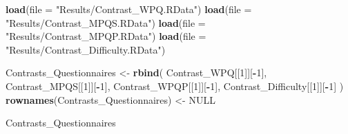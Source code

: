 \documentclass[
]{article}
\newenvironment{Shaded}{\begin{snugshade}}{\end{snugshade}}
\newcommand{\AttributeTok}[1]{\textcolor[rgb]{0.13,0.29,0.53}{#1}}
\newcommand{\ConstantTok}[1]{\textcolor[rgb]{0.56,0.35,0.01}{#1}}
\newcommand{\DecValTok}[1]{\textcolor[rgb]{0.00,0.00,0.81}{#1}}
\newcommand{\FunctionTok}[1]{\textcolor[rgb]{0.13,0.29,0.53}{\textbf{#1}}}
\newcommand{\NormalTok}[1]{#1}
\newcommand{\OtherTok}[1]{\textcolor[rgb]{0.56,0.35,0.01}{#1}}
\newcommand{\SpecialCharTok}[1]{\textcolor[rgb]{0.81,0.36,0.00}{\textbf{#1}}}
\newcommand{\StringTok}[1]{\textcolor[rgb]{0.31,0.60,0.02}{#1}}
\begin{document}
\begin{Shaded}
\begin{Highlighting}[]
\FunctionTok{load}\NormalTok{(}\AttributeTok{file =} \StringTok{"Results/Contrast\_WPQ.RData"}\NormalTok{)}
\FunctionTok{load}\NormalTok{(}\AttributeTok{file =} \StringTok{"Results/Contrast\_MPQS.RData"}\NormalTok{)}
\FunctionTok{load}\NormalTok{(}\AttributeTok{file =} \StringTok{"Results/Contrast\_MPQP.RData"}\NormalTok{)}
\FunctionTok{load}\NormalTok{(}\AttributeTok{file =} \StringTok{"Results/Contrast\_Difficulty.RData"}\NormalTok{)}

\NormalTok{Contrasts\_Questionnaires }\OtherTok{\textless{}{-}} \FunctionTok{rbind}\NormalTok{(}
\NormalTok{Contrast\_WPQ[[}\DecValTok{1}\NormalTok{]][}\SpecialCharTok{{-}}\DecValTok{1}\NormalTok{],}
\NormalTok{Contrast\_MPQS[[}\DecValTok{1}\NormalTok{]][}\SpecialCharTok{{-}}\DecValTok{1}\NormalTok{],}
\NormalTok{Contrast\_WPQP[[}\DecValTok{1}\NormalTok{]][}\SpecialCharTok{{-}}\DecValTok{1}\NormalTok{],}
\NormalTok{Contrast\_Difficulty[[}\DecValTok{1}\NormalTok{]][}\SpecialCharTok{{-}}\DecValTok{1}\NormalTok{] }
\NormalTok{)}
\FunctionTok{rownames}\NormalTok{(Contrasts\_Questionnaires) }\OtherTok{\textless{}{-}} \ConstantTok{NULL}

\NormalTok{Contrasts\_Questionnaires}
\end{Highlighting}
\end{Shaded}
\end{document}
